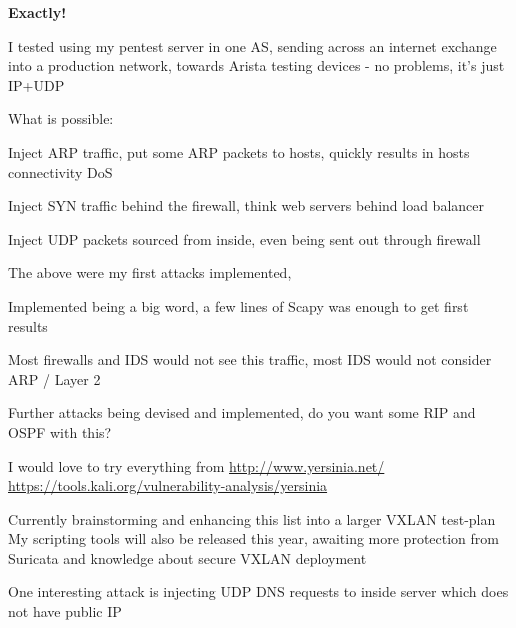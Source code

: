 \documentclass[18pt,landscape,a4paper,footrule]{foils}
\begin{document}
\vskip 1cm
{\bf\LARGE Exactly!}



I tested using my pentest server in one AS, sending across an internet exchange into a production network, towards Arista testing devices - no problems, it's just IP+UDP


What is possible:
\begin{list2}
\item Inject ARP traffic, put some ARP packets to hosts, quickly results in hosts connectivity DoS
\item Inject SYN traffic behind the firewall, think web servers behind load balancer
\item Inject UDP packets sourced from inside, even being sent out through firewall
\item The above were my first attacks implemented,
\item Implemented being a big word, a few lines of Scapy was enough to get first results \smiley
\item Most firewalls and IDS would not see this traffic, most IDS would not consider ARP / Layer 2
\item Further attacks being devised and implemented, do you want some RIP and OSPF with this?
\item I would love to try everything from  \url{http://www.yersinia.net/}\\ \url{https://tools.kali.org/vulnerability-analysis/yersinia}
\end{list2}
\vskip 1cm
Currently brainstorming and enhancing this list into a larger VXLAN test-plan\\
My scripting tools will also be released this year, awaiting more protection from Suricata and knowledge about secure VXLAN deployment




One interesting attack is injecting UDP DNS requests to inside server which does not have public IP
\end{document}
